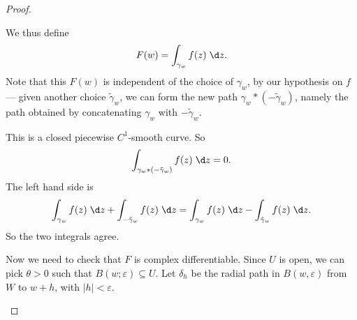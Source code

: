 \documentclass[a4paper]{article}
\begin{document}
\begin{proof}
\begin{center}
  \end{center}
  We thus define
  \[
    F(w) = \int_{\gamma_w} f(z)\;\d z.
  \]
  Note that this $F(w)$ is independent of the choice of $\gamma_w$, by our hypothesis on $f$ --- given another choice $\tilde{\gamma}_w$, we can form the new path $\gamma_w * (-\tilde{\gamma}_w)$, namely the path obtained by concatenating $\gamma_w$ with $-\tilde{\gamma}_w$.
  \begin{center}
  \end{center}
  This is a closed piecewise $C^1$-smooth curve. So
  \[
    \int_{\gamma_w * (-\tilde{\gamma}_w)} f(z) \;\d z = 0.
  \]
  The left hand side is
  \[
    \int_{\gamma_w} f(z)\;\d z + \int_{-\tilde{\gamma}_w}f(z)\;\d z = \int_{\gamma_w} f(z)\;\d z - \int_{\tilde{\gamma}_w} f(z) \;\d z.
  \]
  So the two integrals agree.

  Now we need to check that $F$ is complex differentiable. Since $U$ is open, we can pick $\theta > 0$ such that $B(w; \varepsilon) \subseteq U$. Let $\delta_h$ be the radial path in $B(w, \varepsilon)$ from $W$ to $w + h$, with $|h| < \varepsilon$.
  \begin{center}
\end{center}
\end{proof}
\end{document}
